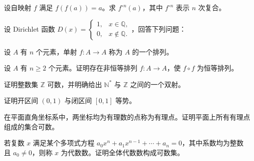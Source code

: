 \noindent\begin{minipage}{\textwidth}
设自映射 $f$ 满足 $f(f(a))=a$。求 $f^{\circ n}(a)$，其中 $f^{\circ n}$ 表示 $n$ 次复合。
\end{minipage}\par\vfill
\noindent\begin{minipage}{\textwidth}
设 Dirichlet 函数 $D(x)=\begin{cases}1,&x\in\mathbb Q,\\0,&x\notin\mathbb Q.\end{cases}$，回答下列问题：
\end{minipage}\par\vfill
\newpage
\noindent\begin{minipage}{\textwidth}
设 $A$ 有 $n$ 个元素，单射 $f:A\to A$ 称为 $A$ 的一个排列。
\end{minipage}\par\vfill
\noindent\begin{minipage}{\textwidth}
设 $A$ 有 $n\ge2$ 个元素。证明存在非恒等排列 $f:A\to A$，使 $f\circ f$ 为恒等排列。
\end{minipage}\par\vfill
\noindent\begin{minipage}{\textwidth}
证明整数集 $\mathbb Z$ 可数，并明确给出 $\mathbb N^*$ 与 $\mathbb Z$ 之间的一个双射。
\end{minipage}\par\vfill
\newpage
\noindent\begin{minipage}{\textwidth}
证明开区间 $(0,1)$ 与闭区间 $[0,1]$ 等势。
\end{minipage}\par\vfill
\noindent\begin{minipage}{\textwidth}
在平面直角坐标系中，两坐标均为有理数的点称为有理点。证明平面上所有有理点组成的集合可数。
\end{minipage}\par\vfill
\noindent\begin{minipage}{\textwidth}
若复数 $x$ 满足某个多项式方程 $a_0x^n+a_1x^{n-1}+\cdots+a_n=0$，其中系数均为整数且 $a_0\ne0$，则称 $x$ 为代数数。证明全体代数数构成可数集。
\end{minipage}\par\vfill
